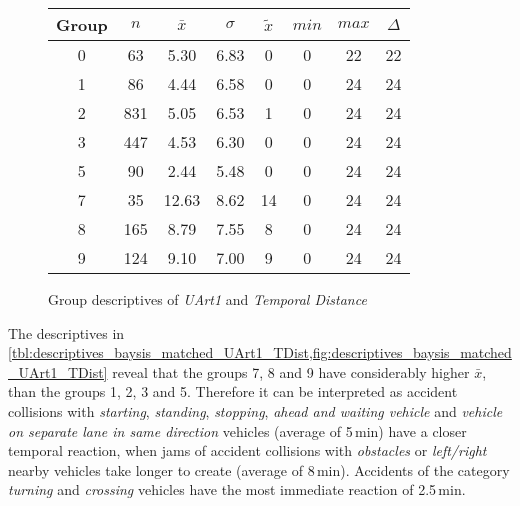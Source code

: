 \begin{figure}[ht!]
	\centering
	\begin{minipage}{0.5\textwidth}
		\tiny
		\setlength{\tabcolsep}{4pt}
		\centering
		\begin{tabular}{c|c|c|c|c|c|c|c}
			\toprule
			Group & $n$ & $\bar{x}$ & $\sigma$ & $\tilde{x}$ & $min$ & $max$ & $\Delta$ \\
			\midrule
			0 & 63  & 5.30  & 6.83 & 0  & 0 & 22 & 22 \\ 
			1 & 86  & 4.44  & 6.58 & 0  & 0 & 24 & 24 \\ 
			2 & 831 & 5.05  & 6.53 & 1  & 0 & 24 & 24 \\ 
			3 & 447 & 4.53  & 6.30 & 0  & 0 & 24 & 24 \\ 
			5 & 90  & 2.44  & 5.48 & 0  & 0 & 24 & 24 \\  
			7 & 35  & 12.63 & 8.62 & 14 & 0 & 24 & 24 \\ 
			8 & 165 & 8.79  & 7.55 & 8  & 0 & 24 & 24 \\ 
			9 & 124 & 9.10  & 7.00 & 9  & 0 & 24 & 24 \\ 
			\bottomrule
		\end{tabular}
		\label{tbl:descriptives_baysis_matched_UArt1_TDist}
	\end{minipage}%
	\begin{minipage}{0.55\textwidth}
		\data 
        \pgfplotstablesort[sort key=mean, sort cmp=float >]{\datasorted}{\data}
        \tiny
        \centering
		\label{fig:descriptives_baysis_matched_UArt1_TDist}
	\end{minipage}%
	\caption{Group descriptives of \textit{UArt1} and \textit{Temporal Distance}}
\end{figure}
The descriptives in \cref{tbl:descriptives_baysis_matched_UArt1_TDist,fig:descriptives_baysis_matched_UArt1_TDist} reveal that the groups 7, 8 and 9 have considerably higher $\bar{x}$, than the groups 1, 2, 3 and 5. Therefore it can be interpreted as accident collisions with \textit{starting}, \textit{standing}, \textit{stopping}, \textit{ahead and waiting vehicle} and \textit{vehicle on separate lane in same direction} vehicles (average of 5\,min) have a closer temporal reaction, when jams of accident collisions with \textit{obstacles} or \textit{left/right} nearby vehicles take longer to create (average of 8\,min). Accidents of the category \textit{turning} and \textit{crossing} vehicles have the most immediate reaction of 2.5\,min.

